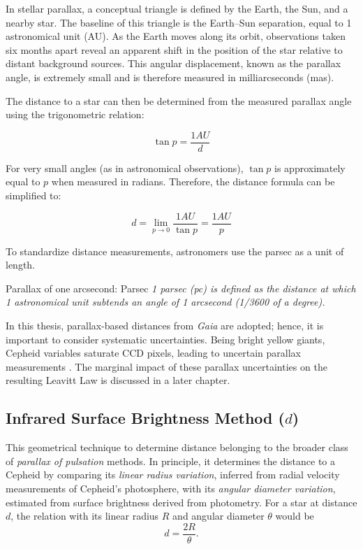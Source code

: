In stellar parallax, a conceptual triangle is defined by the Earth, the Sun, and a nearby star. The baseline of this triangle is the Earth--Sun separation, equal to 1 astronomical unit (AU). As the Earth moves along its orbit, observations taken six months apart reveal an apparent shift in the position of the star relative to distant background sources. This angular displacement, known as the parallax angle, is extremely small and is therefore measured in milliarcseconds (mas).

The distance to a star can then be determined from the measured parallax angle using the trigonometric relation:

\begin{equation}
\tan p = \frac{1 AU}{d}
\end{equation}

For very small angles (as in astronomical observations), $\tan p$ is approximately equal to $p$ when measured in radians. Therefore, the distance formula can be simplified to:

\begin{equation}
d = \lim_{p \to 0} \frac{1 AU}{\tan p} = \frac{1 AU}{p} 
\end{equation}

To standardize distance measurements, astronomers use the parsec as a unit of length.


\begin{notebox}[sharp corners, width=\textwidth]{Parallax of one arcsecond: Parsec}
\textit{1 parsec (pc) is defined as the distance at which 1 astronomical unit subtends an angle of 1 arcsecond (1/3600 of a degree).}
\end{notebox}


In this thesis, parallax-based distances from \textit{Gaia} are adopted; hence, it is important to consider systematic uncertainties. Being bright yellow giants, Cepheid variables saturate CCD pixels, leading to uncertain parallax measurements \citep{2018Lindegren}. The marginal impact of these parallax uncertainties on the resulting Leavitt Law is discussed in a later chapter.



\subsection{Infrared Surface Brightness Method ($d$)}

This geometrical technique to determine distance belonging to the broader class of \emph{parallax of pulsation} methods. In principle, it determines the distance to a Cepheid by comparing its \emph{linear radius variation}, inferred from radial velocity measurements of Cepheid's photosphere, with its \emph{angular diameter variation}, estimated from surface brightness derived from photometry. For a star at distance $d$, the relation with its linear radius $R$ and angular diameter $\theta$ would be
\begin{equation}
d = \frac{2R}{\theta}.
\end{equation}

